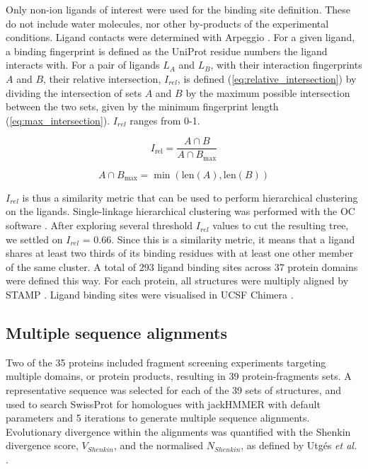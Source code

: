Only non-ion ligands of interest were used for the binding site definition. These do not include water molecules, nor other by-products of the experimental conditions. Ligand contacts were determined with Arpeggio \cite{JUBB_2017_ARPEGGIO}. For a given ligand, a binding fingerprint is defined as the UniProt residue numbers the ligand interacts with. For a pair of ligands $L_{A}$ and $L_{B}$, with their interaction fingerprints $A$ and $B$, their relative intersection, $I_{rel}$, is defined (\autoref{eq:relative_intersection}) by dividing the intersection of sets $A$ and $B$ by the maximum possible intersection between the two sets, given by the minimum fingerprint length (\autoref{eq:max_intersection}). $I_{rel}$ ranges from 0-1.

\begin{equation}
    I_{\mathrm{rel}} = \frac{A \cap B}{A \cap B_{\mathrm{max}}}
\label{eq:relative_intersection} %
\end{equation}

\begin{equation}
    A \cap B_{\mathrm{max}} = \min(\mathrm{len}(A), \mathrm{len}(B))
\label{eq:max_intersection}
\end{equation}

$I_{rel}$ is thus a similarity metric that can be used to perform hierarchical clustering on the ligands. Single-linkage hierarchical clustering was performed with the OC software \cite{BARTON_1993_OC}. After exploring several threshold $I_{rel}$ values to cut the resulting tree, we settled on $I_{rel}$ = 0.66. Since this is a similarity metric, it means that a ligand shares at least two thirds of its binding residues with at least one other member of the same cluster. A total of 293 ligand binding sites across 37 protein domains were defined this way. For each protein, all structures were multiply aligned by STAMP \cite{RUSSELL_1992_STAMP}. Ligand binding sites were visualised in UCSF Chimera \cite{PETTERSEN_2004_CHIMERA}.

\subsection{Multiple sequence alignments}

Two of the 35 proteins included fragment screening experiments targeting multiple domains, or protein products, resulting in 39 protein-fragments sets. A representative sequence was selected for each of the 39 sets of structures, and used to search SwissProt \cite{BOUTET_2016_UNIPROT} for homologues with jackHMMER \cite{EDDY_1995_HMMER} with default parameters and 5 iterations to generate multiple sequence alignments. Evolutionary divergence within the alignments was quantified with the Shenkin divergence score, $V_{Shenkin}$, \cite{SHENKIN_1991_SCORE} and the normalised $N_{Shenkin}$, as defined by Utgés \textit{et al.} \cite{UTGES_2021_ANKS}.

